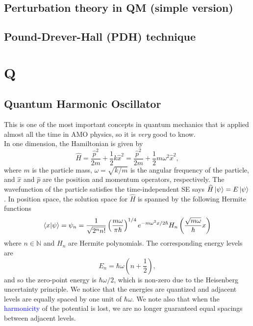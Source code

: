 \documentclass{book}
\theoremstyle{definition}
\newcommand{\f}[2]{\frac{#1}{#2}}
\newcommand{\lp}{\left(}
\newcommand{\rp}{\right)}
\begin{document}
\section*{Perturbation theory in QM (simple version)}





\section*{Pound-Drever-Hall (PDH) technique}
\chapter*{Q}

\section*{Quantum Harmonic Oscillator}

This is one of the most important concepts in quantum mechanics that is applied almost all the time in AMO physics, so it is \textit{very} good to know. \\


In one dimension, the Hamiltonian is given by 
\begin{equation*}
\widehat{H} = \f{\widehat{p}^2}{2m} + \f{1}{2}k\widehat{x}^2 =  \f{\hat{p}^2}{2m} + \f{1}{2}m\omega^2 \widehat{x}^2,
\end{equation*}
where $m$ is the particle mass, $\omega = \sqrt{k/m}$ is the angular frequency of the particle, and $\widehat{x}$ and $\widehat{p}$ are the position and momentum operators, respectively. The wavefunction of the particle satisfies the time-independent SE says $\widehat{H}\ket{\psi} = E\ket{\psi}$. In position space, the solution space for $\widehat{H}$ is spanned by the following Hermite functions
\begin{equation*}
\bra{x}\ket{\psi} = \psi_n = \f{1}{\sqrt{2^n n!}} \lp \f{m\omega}{\pi \hbar} \rp^{1/4} e^{-m\omega^2 x/2\hbar} H_n\lp \f{\sqrt{m\omega}}{\hbar} x \rp
\end{equation*}
where $n \in \mathbb{N}$ and $H_n$ are Hermite polynomials. The corresponding energy levels are 
\begin{equation*}
E_n = \hbar \omega \lp n + \f{1}{2} \rp,
\end{equation*}
and so the zero-point energy is $\hbar\omega/2$, which is non-zero due to the Heisenberg uncertainty principle. We notice that the energies are quantized and adjacent levels are equally spaced by one unit of $\hbar\omega$. We note also that when the \textcolor{blue}{harmonicity} of the potential is lost, we are no longer guaranteed equal spacings between adjacent levels. \\
\end{document}

